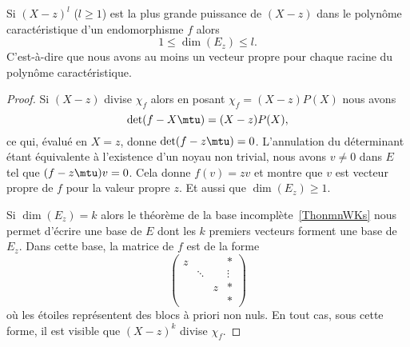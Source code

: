 \begin{proposition}\label{PropooBYZCooBmYLSc}
	Si \( (X-z)^l\) (\( l\geq 1\)) est la plus grande puissance de \( (X-z)\) dans le polynôme caractéristique d'un endomorphisme \( f\) alors
	\begin{equation}
		1\leq \dim(E_z)\leq l.
	\end{equation}
	C'est-à-dire que nous avons au moins un vecteur propre pour chaque racine du polynôme caractéristique.
\end{proposition}

\begin{proof}
	Si \( (X-z)\) divise \( \chi_f\) alors en posant \( \chi_f=(X-z)P(X)\) nous avons
	\begin{equation}
		\det(f-X\mtu)=(X-z)P(X),
	\end{equation}
	ce qui, évalué en \( X=z\), donne \( \det(f-z\mtu)=0\). L'annulation du déterminant étant équivalente à l'existence d'un noyau non trivial, nous avons \( v\neq 0\) dans \( E\) tel que \( (f-z\mtu)v=0\). Cela donne \( f(v)=zv\) et montre que \( v\) est vecteur propre de \( f\) pour la valeur propre \( z\). Et aussi que \( \dim(E_z)\geq 1\).

	Si \( \dim(E_z)=k\) alors le théorème de la base incomplète~\ref{ThonmnWKs} nous permet d'écrire une base de \( E\) dont les \( k\) premiers vecteurs forment une base de \( E_z\). Dans cette base, la matrice de \( f\) est de la forme
	\begin{equation}
		\begin{pmatrix}
			z &        &   & *      \\
			  & \ddots &   & \vdots \\
			  &        & z & *      \\
			  &        &   & *
		\end{pmatrix}
	\end{equation}
	où les étoiles représentent des blocs à priori non nuls. En tout cas, sous cette forme, il est visible que \( (X-z)^k\) divise \( \chi_f\).
\end{proof}


